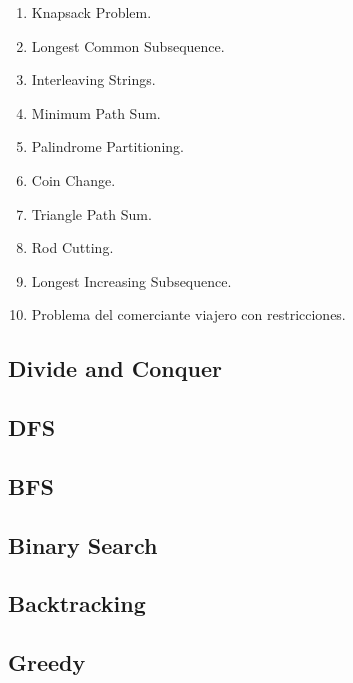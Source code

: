 \begin{enumerate} 
  \item Knapsack Problem.

  \item Longest Common Subsequence.

  \item Interleaving Strings.

  \item Minimum Path Sum.

  \item Palindrome Partitioning.

  \item Coin Change.

  \item Triangle Path Sum.

  \item Rod Cutting.

  \item Longest Increasing Subsequence.

  \item Problema del comerciante viajero con restricciones. 
\end{enumerate}

\subsection{}

\subsection{Divide and Conquer}

\subsection{DFS}

\subsection{BFS}

\subsection{Binary Search}

\subsection{Backtracking}

\subsection{Greedy}

